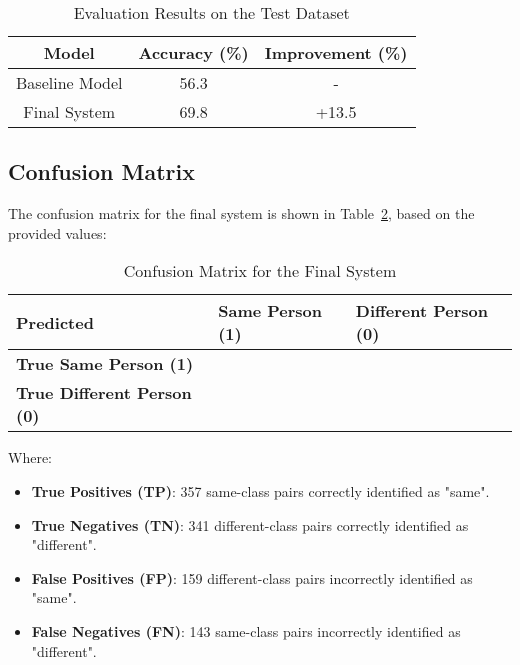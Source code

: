 \documentclass[a4paper]{article}
\begin{document}
\begin{table}[h]
    \centering
    \caption{Evaluation Results on the Test Dataset}
    \label{tab:eval_results}
    \begin{tabular}{ccc}
        \hline
        \textbf{Model} & \textbf{Accuracy (\%)} & \textbf{Improvement (\%)} \\
        \hline
        Baseline Model & 56.3 & - \\
        Final System & 69.8 & +13.5 \\
        \hline
    \end{tabular}
\end{table}

\subsection{Confusion Matrix}
The confusion matrix for the final system is shown in Table~\ref{tab:confusion_matrix}, based on the provided values:

\begin{table}[h]
    \centering
    \caption{Confusion Matrix for the Final System}
    \label{tab:confusion_matrix}
    \renewcommand{\arraystretch}{1.5} %
    \begin{tabular}{|>{\centering\arraybackslash}m{2.5cm}|>{\centering\arraybackslash}m{2cm}|>{\centering\arraybackslash}m{2cm}|}
        \hline
        \textbf{Predicted} & \textbf{Same \newline Person (1)} & \textbf{Different \newline  Person (0)} \\ \hline
        \textbf{True  Same \newline Person (1)} & 357 & 143 \\ \hline
        \textbf{True  Different \newline Person (0)} & 159 & 341 \\ \hline
    \end{tabular}
\end{table}

Where:
\begin{itemize}
    \item \textbf{True Positives (TP)}: 357 same-class pairs correctly identified as "same".
    \item \textbf{True Negatives (TN)}: 341 different-class pairs correctly identified as "different".
    \item \textbf{False Positives (FP)}: 159 different-class pairs incorrectly identified as "same".
    \item \textbf{False Negatives (FN)}: 143 same-class pairs incorrectly identified as "different".
\end{itemize}
\end{document}
